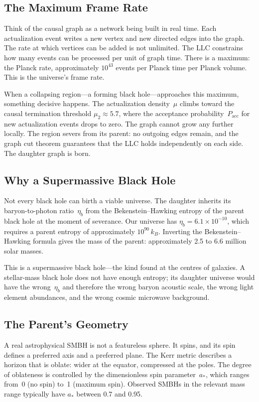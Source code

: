 \documentclass[12pt,a4paper]{article}
\begin{document}
\subsection{The Maximum Frame Rate}

Think of the causal graph as a network being built in real time. Each actualization event writes a new vertex and new directed edges into the graph. The rate at which vertices can be added is not unlimited. The LLC constrains how many events can be processed per unit of graph time. There is a maximum: the Planck rate, approximately $10^{43}$ events per Planck time per Planck volume. This is the universe's frame rate.

When a collapsing region---a forming black hole---approaches this maximum, something decisive happens. The actualization density~$\mu$ climbs toward the causal termination threshold $\mu_2 \approx 5.7$, where the acceptance probability~$P_{\mathrm{acc}}$ for new actualization events drops to zero. The graph cannot grow any further locally. The region severs from its parent: no outgoing edges remain, and the graph cut theorem guarantees that the LLC holds independently on each side. The daughter graph is born.

\subsection{Why a Supermassive Black Hole}

Not every black hole can birth a viable universe. The daughter inherits its baryon-to-photon ratio~$\eta_b$ from the Bekenstein--Hawking entropy of the parent black hole at the moment of severance. Our universe has $\eta_b = 6.1 \times 10^{-10}$, which requires a parent entropy of approximately $10^{90}\,k_B$. Inverting the Bekenstein--Hawking formula gives the mass of the parent: approximately 2.5 to 6.6 million solar masses.

This is a supermassive black hole---the kind found at the centres of galaxies. A stellar-mass black hole does not have enough entropy; its daughter universe would have the wrong~$\eta_b$ and therefore the wrong baryon acoustic scale, the wrong light element abundances, and the wrong cosmic microwave background.

\subsection{The Parent's Geometry}

A real astrophysical SMBH is not a featureless sphere. It spins, and its spin defines a preferred axis and a preferred plane. The Kerr metric describes a horizon that is oblate: wider at the equator, compressed at the poles. The degree of oblateness is controlled by the dimensionless spin parameter~$a_*$, which ranges from~0 (no spin) to~1 (maximum spin). Observed SMBHs in the relevant mass range typically have $a_*$ between 0.7 and 0.95.
\end{document}
